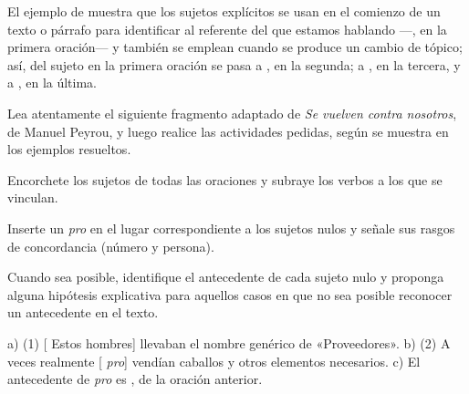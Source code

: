 El ejemplo de  muestra que los sujetos explícitos se usan en
el comienzo de un texto o párrafo para identificar al referente del que estamos
hablando ---, en la primera oración--- y también se emplean
cuando se produce un cambio de tópico; así, del sujeto  en
la primera oración se pasa a , en la segunda; a
, en la tercera, y a , en la última.

\begin{ejercicio}\label{ej:06-peyrou}
Lea atentamente el siguiente fragmento adaptado de \textit{Se vuelven contra
nosotros}, de Manuel Peyrou, y luego realice las actividades pedidas, según se
muestra en los ejemplos resueltos.

\begin{consignas}
  \item Encorchete los sujetos de todas las oraciones y subraye los verbos a los
        que se vinculan.
  \item Inserte un \textit{pro} en el lugar correspondiente a los sujetos nulos y
        señale sus rasgos de concordancia (número y persona).
  \item Cuando sea posible, identifique el antecedente de cada sujeto nulo y
        proponga alguna hipótesis explicativa para aquellos casos en que no sea
        posible reconocer un antecedente en el texto.
\end{consignas}


\begin{resuelto}
a) (1) [ Estos hombres] llevaban el nombre genérico de
«Proveedores». b) (2) A veces realmente [
\textit{pro}\etq{[3.ª pl.]}] vendían caballos y otros elementos
necesarios. c) El antecedente de \textit{pro} es , de la
oración anterior.
\end{resuelto}
\end{ejercicio}

